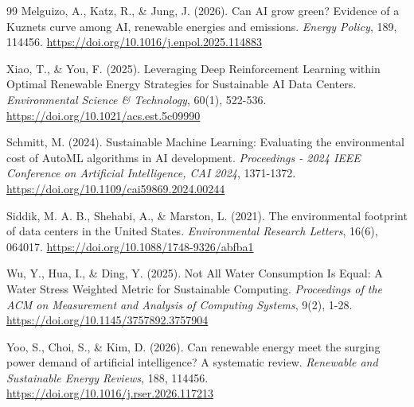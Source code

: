 \documentclass[conference]{IEEEtran}
\begin{document}
\begin{thebibliography}{99}
Melguizo, A., Katz, R., \& Jung, J. (2026). Can AI grow green? Evidence of a Kuznets curve among AI, renewable energies and emissions. \textit{Energy Policy}, 189, 114456. \url{https://doi.org/10.1016/j.enpol.2025.114883}

Xiao, T., \& You, F. (2025). Leveraging Deep Reinforcement Learning within Optimal Renewable Energy Strategies for Sustainable AI Data Centers. \textit{Environmental Science \& Technology}, 60(1), 522-536. \url{https://doi.org/10.1021/acs.est.5c09990}

Schmitt, M. (2024). Sustainable Machine Learning: Evaluating the environmental cost of AutoML algorithms in AI development. \textit{Proceedings - 2024 IEEE Conference on Artificial Intelligence, CAI 2024}, 1371-1372. \url{https://doi.org/10.1109/cai59869.2024.00244}

Siddik, M. A. B., Shehabi, A., \& Marston, L. (2021). The environmental footprint of data centers in the United States. \textit{Environmental Research Letters}, 16(6), 064017. \url{https://doi.org/10.1088/1748-9326/abfba1}

Wu, Y., Hua, I., \& Ding, Y. (2025). Not All Water Consumption Is Equal: A Water Stress Weighted Metric for Sustainable Computing. \textit{Proceedings of the ACM on Measurement and Analysis of Computing Systems}, 9(2), 1-28. \url{https://doi.org/10.1145/3757892.3757904}

Yoo, S., Choi, S., \& Kim, D. (2026). Can renewable energy meet the surging power demand of artificial intelligence? A systematic review. \textit{Renewable and Sustainable Energy Reviews}, 188, 114456. \url{https://doi.org/10.1016/j.rser.2026.117213}

\end{thebibliography}
\end{document}
